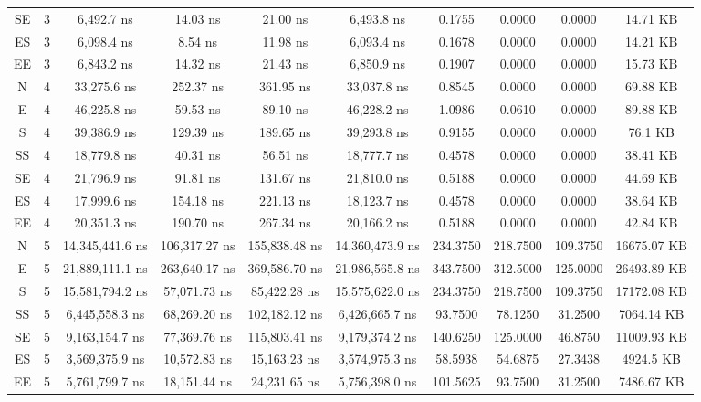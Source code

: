 \begin{sidewaystable}
\begin{tabular}{|c|c|c|c|c|c|c|c|c|c|}
        SE     & 3     & 6,492.7 ns      & 14.03 ns      & 21.00 ns      & 6,493.8 ns      & 0.1755   & 0.0000   & 0.0000   & 14.71 KB    \\
        ES     & 3     & 6,098.4 ns      & 8.54 ns       & 11.98 ns      & 6,093.4 ns      & 0.1678   & 0.0000   & 0.0000   & 14.21 KB    \\
        EE     & 3     & 6,843.2 ns      & 14.32 ns      & 21.43 ns      & 6,850.9 ns      & 0.1907   & 0.0000   & 0.0000   & 15.73 KB    \\
        N      & 4     & 33,275.6 ns     & 252.37 ns     & 361.95 ns     & 33,037.8 ns     & 0.8545   & 0.0000   & 0.0000   & 69.88 KB    \\
        E      & 4     & 46,225.8 ns     & 59.53 ns      & 89.10 ns      & 46,228.2 ns     & 1.0986   & 0.0610   & 0.0000   & 89.88 KB    \\
        S      & 4     & 39,386.9 ns     & 129.39 ns     & 189.65 ns     & 39,293.8 ns     & 0.9155   & 0.0000   & 0.0000   & 76.1 KB     \\
        SS     & 4     & 18,779.8 ns     & 40.31 ns      & 56.51 ns      & 18,777.7 ns     & 0.4578   & 0.0000   & 0.0000   & 38.41 KB    \\
        SE     & 4     & 21,796.9 ns     & 91.81 ns      & 131.67 ns     & 21,810.0 ns     & 0.5188   & 0.0000   & 0.0000   & 44.69 KB    \\
        ES     & 4     & 17,999.6 ns     & 154.18 ns     & 221.13 ns     & 18,123.7 ns     & 0.4578   & 0.0000   & 0.0000   & 38.64 KB    \\
        EE     & 4     & 20,351.3 ns     & 190.70 ns     & 267.34 ns     & 20,166.2 ns     & 0.5188   & 0.0000   & 0.0000   & 42.84 KB    \\
        N      & 5     & 14,345,441.6 ns & 106,317.27 ns & 155,838.48 ns & 14,360,473.9 ns & 234.3750 & 218.7500 & 109.3750 & 16675.07 KB \\
        E      & 5     & 21,889,111.1 ns & 263,640.17 ns & 369,586.70 ns & 21,986,565.8 ns & 343.7500 & 312.5000 & 125.0000 & 26493.89 KB \\
        S      & 5     & 15,581,794.2 ns & 57,071.73 ns  & 85,422.28 ns  & 15,575,622.0 ns & 234.3750 & 218.7500 & 109.3750 & 17172.08 KB \\
        SS     & 5     & 6,445,558.3 ns  & 68,269.20 ns  & 102,182.12 ns & 6,426,665.7 ns  & 93.7500  & 78.1250  & 31.2500  & 7064.14 KB  \\
        SE     & 5     & 9,163,154.7 ns  & 77,369.76 ns  & 115,803.41 ns & 9,179,374.2 ns  & 140.6250 & 125.0000 & 46.8750  & 11009.93 KB \\
        ES     & 5     & 3,569,375.9 ns  & 10,572.83 ns  & 15,163.23 ns  & 3,574,975.3 ns  & 58.5938  & 54.6875  & 27.3438  & 4924.5 KB   \\
        EE     & 5     & 5,761,799.7 ns  & 18,151.44 ns  & 24,231.65 ns  & 5,756,398.0 ns  & 101.5625 & 93.7500  & 31.2500  & 7486.67 KB  \\
        \hline
    \end{tabular}
\end{sidewaystable}
